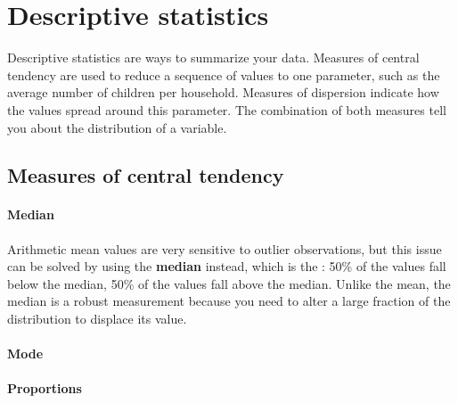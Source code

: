 %
%
%
\section{Descriptive statistics}
  \label{sec:summary}%

Descriptive statistics are ways to summarize your data. Measures of central tendency are used to reduce a sequence of values to one parameter, such as the average number of children per household. Measures of dispersion indicate how the values spread around this parameter. The combination of both measures tell you about the distribution of a variable.%

	\subsection{Measures of central tendency}%
    

    \paragraph{Median}%
    Arithmetic mean values are very sensitive to outlier observations, but this issue can be solved by using the \textbf{median} instead, which is the : 50\% of the values fall below the median, 50\% of the values fall above the median. Unlike the mean, the median is a robust measurement because you need to alter a large fraction of the distribution to displace its value.

    \paragraph{Mode}%

  \paragraph{Proportions}%


